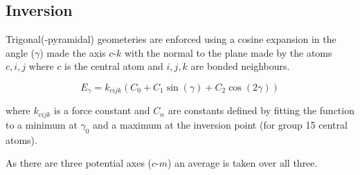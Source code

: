\documentclass[10pt]{article}
\begin{document}
\subsection{Inversion}

Trigonal(-pyramidal) geometeries are enforced using a cosine expansion in the angle ($\gamma$)
made the axis $c\text{-}k$ with the normal to the plane made by the atoms $c, i, j$ where $c$ is
the central atom and $i,j,k$ are bonded neighbours.

\begin{equation}
    E_\gamma = k_{cijk} (C_0 + C_1 \sin(\gamma) + C_2 \cos(2\gamma))
\end{equation}

where $k_{cijk}$ is a force constant and $C_n$ are constants defined by fitting the 
function to a minimum at $\gamma_0$ and a maximum at the inversion point (for group 15 central atoms). 

As there are three potential axes ($c\text{-}m$) an average is taken over all three.
\end{document}
